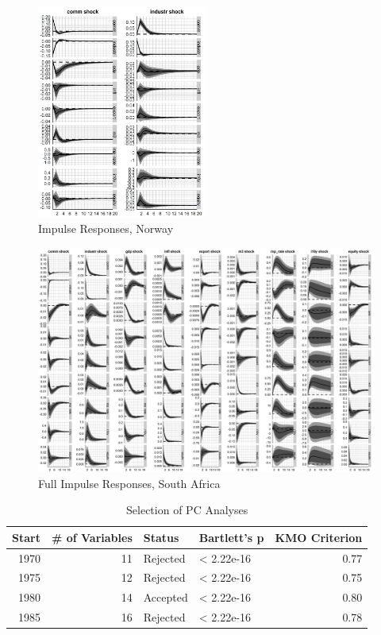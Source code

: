 \documentclass[12pt,]{article}
\begin{document}
\begin{figure}
\centering
\includegraphics[width=0.50000\textwidth]{img/irf_short_NOR.png}
\caption{Impulse Responses, Norway}
\end{figure}

\begin{figure}
\centering
\includegraphics[width=1.00000\textwidth]{img/irf_all_ZAF.png}
\caption{Full Impulse Responses, South Africa}
\end{figure}

\begin{table}

\caption{\label{tab:unnamed-chunk-5}Selection of PC Analyses}
\centering
\begin{tabular}[t]{r|r|l|l|r}
\hline
Start & \# of Variables & Status & Bartlett's p & KMO Criterion\\
\hline
1970 & 11 & Rejected & < 2.22e-16 & 0.77\\
\hline
1975 & 12 & Rejected & < 2.22e-16 & 0.75\\
\hline
1980 & 14 & Accepted & < 2.22e-16 & 0.80\\
\hline
1985 & 16 & Rejected & < 2.22e-16 & 0.78\\
\hline
\end{tabular}
\end{table}
\end{document}
